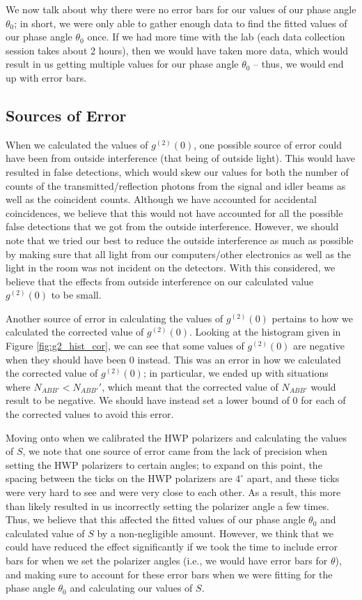 \documentclass[twocolumn,amsmath,amssymb,pra]{revtex4-2}
\begin{document}
We now talk about why there were no error bars for our values of our phase angle $\theta_{0}$; in short, we were only able to gather enough data to find the fitted values of our phase angle $\theta_{0}$ once. If we had more time with the lab (each data collection session takes about 2 hours), then we would have taken more data, which would result in us getting multiple values for our phase angle $\theta_{0}$ -- thus, we would end up with error bars.

\subsection{Sources of Error}
When we calculated the values of $g^{(2)}(0)$, one possible source of error could have been from outside interference (that being of outside light). This would have resulted in false detections, which would skew our values for both the number of counts of the transmitted/reflection photons from the signal and idler beams as well as the coincident counts. Although we have accounted for accidental coincidences, we believe that this would not have accounted for all the possible false detections that we got from the outside interference. However, we should note that we tried our best to reduce the outside interference as much as possible by making sure that all light from our computers/other electronics as well as the light in the room was not incident on the detectors. With this considered, we believe that the effects from outside interference on our calculated value $g^{(2)}(0)$ to be small. 

Another source of error in calculating the values of $g^{(2)}(0)$ pertains to how we calculated the corrected value of $g^{(2)}(0)$. Looking at the histogram given in Figure \ref{fig:g2_hist_cor}, we can see that some values of $g^{(2)}(0)$ are negative when they should have been 0 instead. This was an error in how we calculated the corrected value of $g^{(2)}(0)$; in particular, we ended up with situations where $N_{ABB'} < N_{ABB'}'$, which meant that the corrected value of $N_{ABB'}$ would result to be negative. We should have instead set a lower bound of 0 for each of the corrected values to avoid this error.

Moving onto when we calibrated the HWP polarizers and calculating the values of $S$, we note that one source of error came from the lack of precision when setting the HWP polarizers to certain angles; to expand on this point, the spacing between the ticks on the HWP polarizers are $4^{\circ}$ apart, and these ticks were very hard to see and were very close to each other. As a result, this more than likely resulted in us incorrectly setting the polarizer angle a few times. Thus, we believe that this affected the fitted values of our phase angle $\theta_{0}$ and calculated value of $S$ by a non-negligible amount. However, we think that we could have reduced the effect significantly if we took the time to include error bars for when we set the polarizer angles (i.e., we would have error bars for $\theta$), and making sure to account for these error bars when we were fitting for the phase angle $\theta_{0}$ and calculating our values of $S$.
\end{document}
